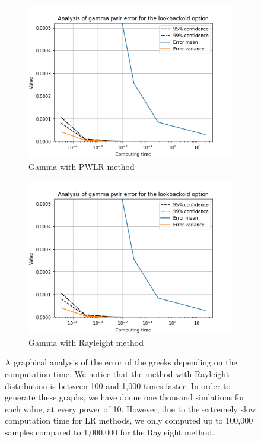 \documentclass[11pt,a4paper,fleqn,draft]{article}
\begin{document}
\begin{figure}[h!]
       \begin{subfigure}[b]{0.45\textwidth}
           \includegraphics[width=\textwidth]{graphs/lookbackoldgammapwlrtime.png}
           \caption{Gamma with PWLR method}
       \end{subfigure}
       \begin{subfigure}[b]{0.45\textwidth}
           \includegraphics[width=\textwidth]{graphs/lookbackoldgammapwlrtime.png}
          \caption{Gamma with Rayleight method}
      \end{subfigure}

        \caption{\label{fig:lboptiongraphs}A graphical analysis of the error of the greeks depending on the computation time. We notice that the method with Rayleight distribution is between 100 and 1,000 times faster. In order to generate these graphs, we have donne one thousand simlations for each value, at every power of 10. However, due to the extremely slow computation time for LR methods, we only computed up to 100,000 samples compared to 1,000,000 for the Rayleight method.}
 \end{figure}
 \FloatBarrier
\end{document}
